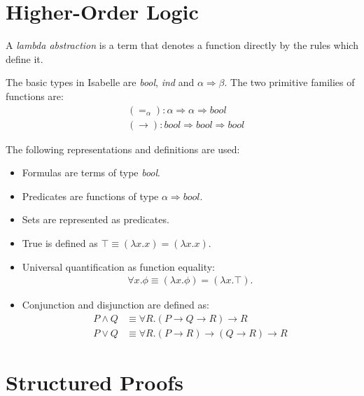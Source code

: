 \documentclass{article}
\begin{document}
\section{Higher-Order Logic}

\begin{definition}
	A \emph{lambda abstraction} is a term that denotes a function directly by the
	rules which define it.
\end{definition}

\begin{definition}
	The basic types in Isabelle are \emph{bool}, \emph{ind} and $\alpha\Rightarrow\beta$.
	The two primitive families of functions are:
	\begin{align*}
		 & (=_\alpha): \alpha\Rightarrow \alpha \Rightarrow \textit{bool}                \\
		 & (\rightarrow): \textit{bool} \Rightarrow\textit{bool}\Rightarrow\textit{bool}
	\end{align*}
\end{definition}

\begin{definition}
	The following representations and definitions are used:
	\begin{itemize}
		\item Formulas are terms of type \textit{bool}.
		\item Predicates are functions of type $\alpha\Rightarrow\textit{bool}$.
		\item Sets are represented as predicates.
		\item True is defined as $\top \equiv (\lambda x.x)=(\lambda x.x)$.
		\item Universal quantification as function equality: \begin{align*}
			      \forall x. \phi \equiv (\lambda x. \phi) = (\lambda x. \top).
		      \end{align*}
		\item Conjunction and disjunction are defined as: \begin{align*}
			      P\wedge Q & \equiv \forall R. (P\rightarrow Q \rightarrow R) \rightarrow R               \\
			      P\vee Q   & \equiv \forall R. (P\rightarrow R)\rightarrow (Q\rightarrow R) \rightarrow R
		      \end{align*}
	\end{itemize}
\end{definition}

\section{Structured Proofs}
\end{document}

